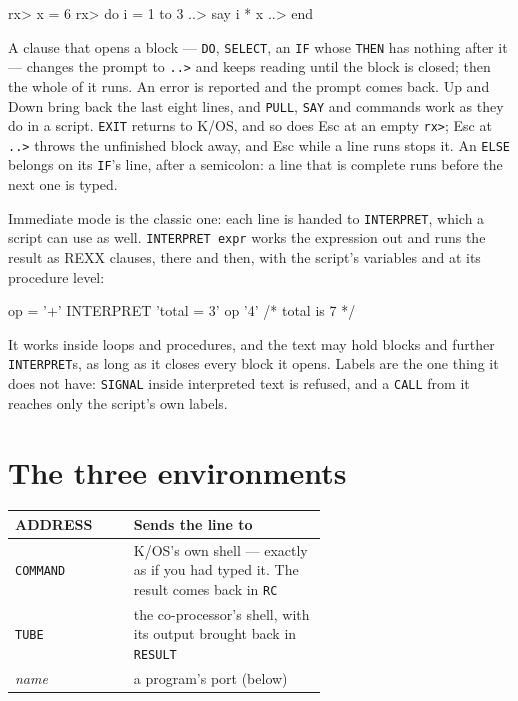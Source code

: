 \begin{type}
rx> x = 6
rx> do i = 1 to 3
..> say i * x
..> end
\end{type}

\noindent A clause that opens a block --- \verb|DO|, \verb|SELECT|, an
\verb|IF| whose \verb|THEN| has nothing after it --- changes the prompt
to \verb|..>| and keeps reading until the block is closed; then the
whole of it runs. An error is reported and the prompt comes back. Up and
Down bring back the last eight lines, and \verb|PULL|, \verb|SAY| and
commands work as they do in a script. \verb|EXIT| returns to K/OS, and so
does Esc at an empty \verb|rx>|; Esc at \verb|..>| throws the unfinished
block away, and Esc while a line runs stops it. An \verb|ELSE| belongs on
its \verb|IF|'s line, after a semicolon: a line that is complete runs
before the next one is typed.

Immediate mode is the classic one: each line is handed to
\verb|INTERPRET|, which a script can use as well. \verb|INTERPRET expr|
works the expression out and runs the result as REXX clauses, there and
then, with the script's variables and at its procedure level:

\begin{type}
op = '+'
INTERPRET 'total = 3' op '4'     /* total is 7 */
\end{type}

\noindent It works inside loops and procedures, and the text may hold
blocks and further \verb|INTERPRET|s, as long as it closes every block it
opens. Labels are the one thing it does not have: \verb|SIGNAL| inside
interpreted text is refused, and a \verb|CALL| from it reaches only the
script's own labels.

\section{The three environments}
\begin{center}
\small
\begin{tabular}{@{}l >{\raggedright\arraybackslash}p{0.62\linewidth}@{}}
\toprule
\textbf{ADDRESS} & \textbf{Sends the line to} \\
\midrule
\texttt{COMMAND} & K/OS's own shell --- exactly as if you had typed it. The result comes back in \verb|RC| \\
\texttt{TUBE} & the co-processor's shell, with its output brought back in \verb|RESULT| \\
\emph{name} & a program's port (below) \\
\bottomrule
\end{tabular}
\end{center}

